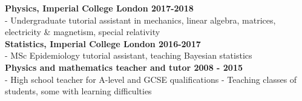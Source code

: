 
\noindent \textbf{Physics, Imperial College London \hfill 2017-2018}\\
\noindent - Undergraduate tutorial assistant in mechanics, linear algebra, matrices, electricity \& magnetism, special relativity\\

\noindent \textbf{Statistics, Imperial College London \hfill 2016-2017}\\
- MSc Epidemiology tutorial assistant, teaching Bayesian statistics\\

\noindent \textbf{Physics and mathematics teacher and tutor \hfill 2008 - 2015}\\
- High school teacher for A-level and GCSE qualifications
- Teaching classes of students, some with learning difficulties	


